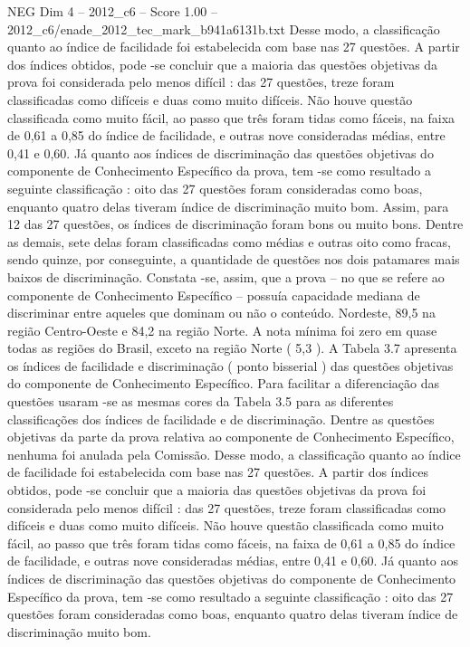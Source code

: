 \begin{textsample}{NEG Dim 4 – 2012\_c6 – Score 1.00 – 2012\_c6/enade\_2012\_tec\_mark\_b941a6131b.txt}
Desse modo, a classificação quanto ao índice de facilidade foi estabelecida com base nas 27 questões.
A partir dos índices obtidos, pode -se concluir que a maioria das questões objetivas da prova foi considerada pelo menos difícil : das 27 questões, treze foram classificadas como difíceis e duas como muito difíceis.
Não houve questão classificada como muito fácil, ao passo que três foram tidas como fáceis, na faixa de 0,61 a 0,85 do índice de facilidade, e outras nove consideradas médias, entre 0,41 e 0,60.
Já quanto aos índices de discriminação das questões objetivas do componente de Conhecimento Específico da prova, tem -se como resultado a seguinte classificação : oito das 27 questões foram consideradas como boas, enquanto quatro delas tiveram índice de discriminação muito bom.
Assim, para 12 das 27 questões, os índices de discriminação foram bons ou muito bons.
Dentre as demais, sete delas foram classificadas como médias e outras oito como fracas, sendo quinze, por conseguinte, a quantidade de questões nos dois patamares mais baixos de discriminação.
Constata -se, assim, que a prova – no que se refere ao componente de Conhecimento Específico – possuía capacidade mediana de discriminar entre aqueles que dominam ou não o conteúdo.
Nordeste, 89,5 na região Centro-Oeste e 84,2 na região Norte.
A nota mínima foi zero em quase todas as regiões do Brasil, exceto na região Norte ( 5,3 ).
A Tabela 3.7 apresenta os índices de facilidade e discriminação ( ponto bisserial ) das questões objetivas do componente de Conhecimento Específico.
Para facilitar a diferenciação das questões usaram -se as mesmas cores da Tabela 3.5 para as diferentes classificações dos índices de facilidade e de discriminação.
Dentre as questões objetivas da parte da prova relativa ao componente de Conhecimento Específico, nenhuma foi anulada pela Comissão.
Desse modo, a classificação quanto ao índice de facilidade foi estabelecida com base nas 27 questões.
A partir dos índices obtidos, pode -se concluir que a maioria das questões objetivas da prova foi considerada pelo menos difícil : das 27 questões, treze foram classificadas como difíceis e duas como muito difíceis.
Não houve questão classificada como muito fácil, ao passo que três foram tidas como fáceis, na faixa de 0,61 a 0,85 do índice de facilidade, e outras nove consideradas médias, entre 0,41 e 0,60.
Já quanto aos índices de discriminação das questões objetivas do componente de Conhecimento Específico da prova, tem -se como resultado a seguinte classificação : oito das 27 questões foram consideradas como boas, enquanto quatro delas tiveram índice de discriminação muito bom.

\end{textsample}
